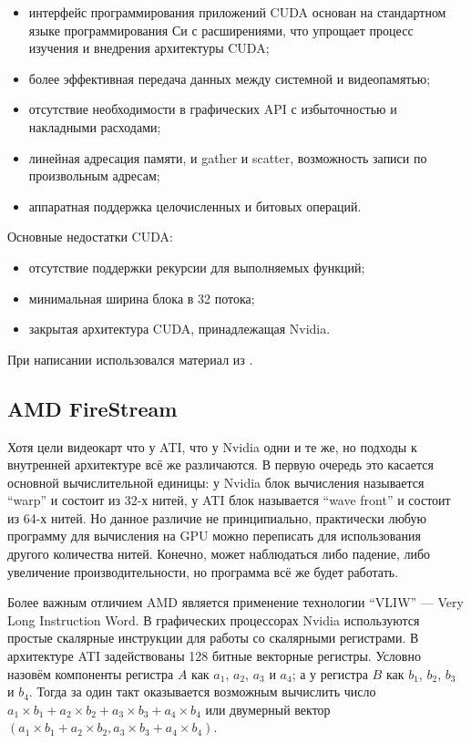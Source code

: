 \begin{itemize}
  \item{интерфейс программирования приложений CUDA основан на стандартном языке программирования Си с расширениями, что упрощает процесс изучения и внедрения архитектуры CUDA;}
\item{более эффективная передача данных между системной и видеопамятью;}
\item{отсутствие необходимости в графических API с избыточностью и накладными расходами;}
\item{линейная адресация памяти, и gather и scatter, возможность записи по произвольным адресам;}
\item{аппаратная поддержка целочисленных и битовых операций.}
\end{itemize}

Основные недостатки CUDA:

\begin{itemize}
\item{отсутствие поддержки рекурсии для выполняемых функций;}
\item{минимальная ширина блока в 32 потока;}
\item{закрытая архитектура CUDA, принадлежащая Nvidia.}
\end{itemize}

При написании использовался материал из \cite{nvidiacuda}.

\subsection{AMD FireStream}

Хотя цели видеокарт что у ATI, что у Nvidia одни и те же, но подходы к внутренней архитектуре всё же различаются. В первую очередь это касается основной вычислительной единицы: у Nvidia блок вычисления называется ``warp'' и состоит из 32-х нитей, у ATI блок называется ``wave front'' и состоит из 64-х нитей. Но данное различие не принципиально, практически любую программу для вычисления на GPU можно переписать для использования другого количества нитей. Конечно, может наблюдаться либо падение, либо увеличение производительности, но программа всё же будет работать.

Более важным отличием AMD является применение технологии ``VLIW'' --- Very Long Instruction Word. В графических процессорах Nvidia используются простые скалярные инструкции для работы со скалярными регистрами. В архитектуре ATI задействованы 128 битные векторные регистры. Условно назовём компоненты регистра $A$ как $a_1$, $a_2$, $a_3$ и $a_4$; а у регистра $B$ как $b_1$, $b_2$, $b_3$ и $b_4$. Тогда за один такт оказывается возможным вычислить число $a_1 \times b_1 + a_2 \times b_2 + a_3 \times b_3 + a_4 \times b_4$ или двумерный вектор $(a_1 \times b_1 + a_2 \times b_2, a_3 \times b_3 + a_4 \times b_4)$.

